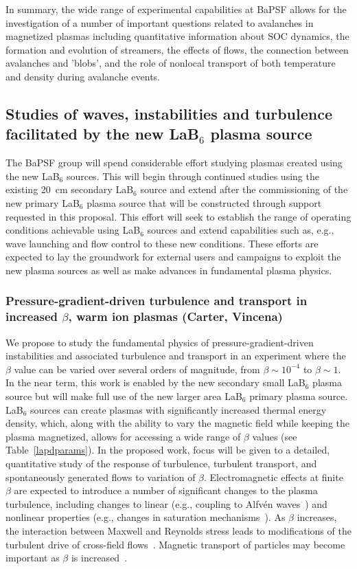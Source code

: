 \documentclass[11pt]{article}
\renewcommand{\cite}{\citep}
\begin{document}
In summary, the wide range of experimental capabilities at BaPSF allows
for the investigation of a number of important questions related to
avalanches in magnetized plasmas including quantitative information about SOC dynamics, the formation and evolution
of streamers, the effects of flows, the connection between avalanches
and 'blobs', and the role of nonlocal transport of both temperature and
density during avalanche events.


\subsection{Studies of waves, instabilities and turbulence facilitated
  by the new LaB$_6$ plasma source}

The BaPSF group will spend considerable effort studying plasmas
created using the new LaB$_6$ sources.  This will begin through
continued studies using the existing 20~cm secondary LaB$_6$ source
and extend after the commissioning of the new primary LaB$_6$ plasma
source that will be constructed through support requested in this
proposal.  This effort will seek to establish the range of operating
conditions achievable using LaB$_6$ sources and extend capabilities
such as, e.g., wave launching and flow control to these new
conditions.   These efforts are expected to lay the groundwork for
external users and campaigns to exploit the new plasma sources as well
as make advances in fundamental plasma physics.

\subsubsection{Pressure-gradient-driven turbulence and transport in increased $\beta$, warm ion
  plasmas (Carter, Vincena) } 

We propose to study the fundamental physics of
pressure-gradient-driven instabilities and associated turbulence and
transport in an experiment where the $\beta$ value can be varied over
several orders of magnitude, from $\beta\sim 10^{-4}$ to $\beta\sim
1$. In the near term, this work is enabled by the new secondary small
LaB$_6$ plasma source but will make full use of the new larger area
LaB$_6$ primary plasma source. LaB$_6$ sources can create plasmas with
significantly increased thermal energy density, which, along with the
ability to vary the magnetic field while keeping the plasma
magnetized, allows for accessing a wide range of $\beta$ values (see
Table~\ref{lapdparams}). In the proposed work, focus will be given to
a detailed, quantitative study of the response of turbulence,
turbulent transport, and spontaneously generated flows to variation of
$\beta$. Electromagnetic effects at finite $\beta$ are expected to
introduce a number of significant changes to the plasma turbulence,
including changes to linear (e.g., coupling to Alfv\'{e}n
waves~\cite{dalf99,morales99,burke00,zweben79}) and nonlinear
properties (e.g., changes in saturation
mechanisms~\cite{ppcf01,em1,em2}).  As $\beta$ increases, the
interaction between Maxwell and Reynolds stress leads to modifications
of the turbulent drive of cross-field
flows~\cite{stress1,stress2}. Magnetic transport of particles may
become important as $\beta$ is increased~\cite{liewer85,stoneking94}.  
\end{document}
